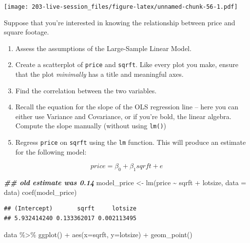 \documentclass[
]{book}
\newenvironment{Shaded}{\begin{snugshade}}{\end{snugshade}}
\newcommand{\AttributeTok}[1]{\textcolor[rgb]{0.77,0.63,0.00}{#1}}
\newcommand{\DocumentationTok}[1]{\textcolor[rgb]{0.56,0.35,0.01}{\textbf{\textit{#1}}}}
\newcommand{\FunctionTok}[1]{\textcolor[rgb]{0.00,0.00,0.00}{#1}}
\newcommand{\NormalTok}[1]{#1}
\newcommand{\OtherTok}[1]{\textcolor[rgb]{0.56,0.35,0.01}{#1}}
\newcommand{\SpecialCharTok}[1]{\textcolor[rgb]{0.00,0.00,0.00}{#1}}
\theoremstyle{definition}
\theoremstyle{definition}
\theoremstyle{definition}
\theoremstyle{definition}
\theoremstyle{remark}
\begin{document}
\texttt{[image: 203-live-session\_files/figure-latex/unnamed-chunk-56-1.pdf]}

Suppose that you're interested in knowing the relationship between price and square footage.

\begin{enumerate}
\def\labelenumi{\arabic{enumi}.}
\setcounter{enumi}{-1}
\item
  Assess the assumptions of the Large-Sample Linear Model.
\item
  Create a scatterplot of \texttt{price} and \texttt{sqrft}. Like every plot you make, ensure that the plot \emph{minimally} has a title and meaningful axes.
\item
  Find the correlation between the two variables.
\item
  Recall the equation for the slope of the OLS regression line -- here you can either use Variance and Covariance, or if you're bold, the linear algebra. Compute the slope manually (without using \texttt{lm()})
\item
  Regress \texttt{price} on \texttt{sqrft} using the \texttt{lm} function. This will produce an estimate for the following model:
\end{enumerate}

\[ 
price = \beta_{0} + \beta_{1} sqrft + e
\]

\begin{Shaded}
\begin{Highlighting}[]
\DocumentationTok{\#\# old estimate was 0.14}
\NormalTok{model\_price }\OtherTok{\textless{}{-}} \FunctionTok{lm}\NormalTok{(price }\SpecialCharTok{\textasciitilde{}}\NormalTok{ sqrft }\SpecialCharTok{+}\NormalTok{ lotsize, }\AttributeTok{data =}\NormalTok{ data)}
\FunctionTok{coef}\NormalTok{(model\_price)}
\end{Highlighting}
\end{Shaded}

\begin{verbatim}
## (Intercept)       sqrft     lotsize 
## 5.932414240 0.133362017 0.002113495
\end{verbatim}

\begin{Shaded}
\begin{Highlighting}[]
\NormalTok{data }\SpecialCharTok{\%\textgreater{}\%} 
  \FunctionTok{ggplot}\NormalTok{() }\SpecialCharTok{+} 
  \FunctionTok{aes}\NormalTok{(}\AttributeTok{x=}\NormalTok{sqrft, }\AttributeTok{y=}\NormalTok{lotsize) }\SpecialCharTok{+} 
  \FunctionTok{geom\_point}\NormalTok{()}
\end{Highlighting}
\end{Shaded}
\end{document}
